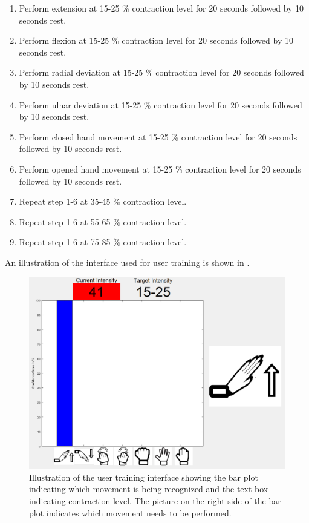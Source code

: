 \begin{enumerate}
	\item Perform extension at 15-25 \% contraction level for 20 seconds followed by 10 seconds rest.
	\item Perform flexion at 15-25 \% contraction level for 20 seconds followed by 10 seconds rest.
	\item Perform radial deviation at 15-25 \% contraction level for 20 seconds followed by 10 seconds rest.
	\item Perform ulnar deviation at 15-25 \% contraction level for 20 seconds followed by 10 seconds rest.
	\item Perform closed hand movement at 15-25 \% contraction level for 20 seconds followed by 10 seconds rest.
	\item Perform opened hand movement at 15-25 \% contraction level for 20 seconds followed by 10 seconds rest.
	\item Repeat step 1-6 at 35-45 \% contraction level.
	\item Repeat step 1-6 at 55-65 \% contraction level.
	\item Repeat step 1-6 at 75-85 \% contraction level.
\end{enumerate} 

An illustration of the interface used for user training is shown in .

\begin{figure}[H]                 
	\includegraphics[width=.6\textwidth]{figures/xBackground/usertraincontrolGUI}  
	\caption{Illustration of the user training interface showing the bar plot indicating which movement is being recognized and the text box indicating contraction level. The picture on the right side of the bar plot indicates which movement needs to be performed.}
	\label{fig:usertraincontrolGUI} 
\end{figure}

